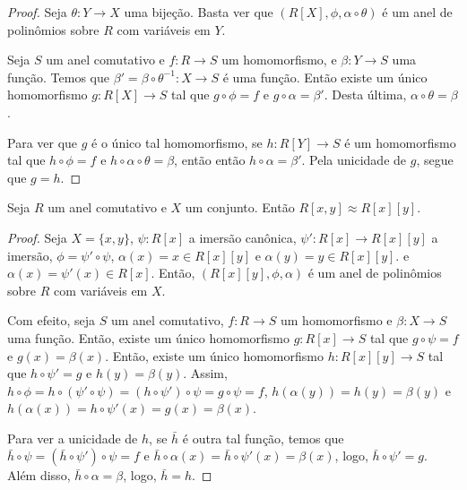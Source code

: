 \begin{proof}
Seja $\theta:Y\rightarrow X$ uma bijeção. Basta ver que $(R[X], \phi, \alpha\circ \theta)$ é um anel de polinômios sobre $R$ com variáveis em $Y$.

Seja $S$ um anel comutativo e $f:R\rightarrow S$ um homomorfismo, e $\beta:Y\rightarrow S$ uma função.
Temos que $\beta'=\beta\circ \theta^{-1}:X\rightarrow S$ é uma função.
Então existe um único homomorfismo $g: R[X]\rightarrow S$ tal que $g\circ \phi=f$ e $g\circ \alpha=\beta'$.
Desta última, $\alpha\circ \theta=\beta$.

Para ver que $g$ é o único tal homomorfismo, se $h: R[Y]\rightarrow S$ é um homomorfismo tal que $h\circ \phi=f$ e $h\circ \alpha\circ \theta=\beta$, então então $h\circ \alpha=\beta'$.
Pela unicidade de $g$, segue que $g=h$.
\end{proof}
\begin{prop}
    Seja $R$ um anel comutativo e $X$ um conjunto. Então $R[x, y]\approx R[x][y]$.
\end{prop}
\begin{proof}
    Seja $X=\{x, y\}$, $\psi:R[x]$ a imersão canônica, $\psi': R[x]\rightarrow R[x][y]$ a imersão, $\phi=\psi'\circ \psi$, $\alpha(x)=x\in R[x][y]$ e $\alpha(y)=y\in R[x][y]$. e $\alpha(x)=\psi'(x)\in R[x]$.
    Então, $(R[x][y], \phi, \alpha)$ é um anel de polinômios sobre $R$ com variáveis em $X$.

    Com efeito, seja $S$ um anel comutativo, $f:R\rightarrow S$ um homomorfismo e $\beta:X\rightarrow S$ uma função.
    Então, existe um único homomorfismo $g:R[x]\rightarrow S$ tal que $g\circ \psi=f$ e $g(x)=\beta(x)$.
    Então, existe um único homomorfismo $h:R[x][y]\rightarrow S$ tal que $h\circ \psi'=g$ e $h(y)=\beta(y)$.
    Assim, $h\circ \phi=h\circ(\psi'\circ \psi)=(h\circ \psi')\circ \psi=g\circ \psi=f$, $h(\alpha(y))=h(y)=\beta(y)$ e $h(\alpha(x))=h\circ \psi'(x)=g(x)=\beta(x)$.

    Para ver a unicidade de $h$, se $\bar h$ é outra tal função, temos que $\bar h\circ \psi=(\bar h\circ \psi')\circ \psi=f$ e $\bar h\circ \alpha(x)=\bar h\circ \psi'(x)=\beta(x)$, logo, $\bar h\circ \psi'=g$.
    Além disso, $\bar h\circ \alpha=\beta$, logo, $\bar h=h$.
\end{proof}

